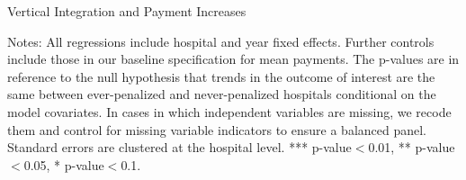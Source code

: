 \documentclass[12pt]{article}
\begin{document}
\newpage
{}
\setlength{\captionmargin}{.5 \textwidth} \addtolength{\captionmargin}{-.5\wd\gfxbox}
\begin{table}[!h]
\centering
\caption{Vertical Integration and Payment Increases}
\label{tab:vint}
\usebox{\gfxbox}
\par
\begin{minipage}{\wd\gfxbox}
\footnotesize
Notes: All regressions include hospital and year fixed effects.  Further controls include those in our baseline specification for mean payments.  The p-values are in reference to the null hypothesis that trends in the outcome of interest are the same between ever-penalized and never-penalized hospitals conditional on the model covariates.  In cases in which independent variables are missing, we recode them and control for missing variable indicators to ensure a balanced panel.  Standard errors are clustered at the hospital level.  *** p-value$<$0.01, ** p-value$<$0.05, * p-value$<$0.1.
\end{minipage}
\end{table}
\end{document}
